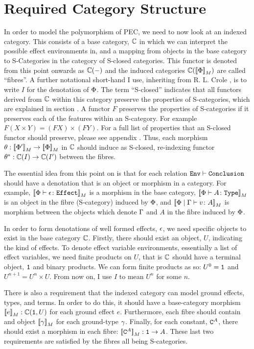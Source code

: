 \documentclass{Report}
\begin{document}
\section{Required Category Structure}
In order to model the polymorphism of PEC, we need to now look at an indexed category. This consists of a base category, $\C$ in which we can interpret the possible effect environments in, and a mapping from objects in the base category to S-Categories in the category of S-closed categories. This functor is denoted from this point onwards as $\C(-)$ and the induced categories $\C(\deno{\P})$ are called ``fibres''. A further notational short-hand I use, inheriting from R. L. Crole , is to write $I$ for the denotation of $\P$. The term ``S-closed'' indicates that all functors derived from $\C$ within this category preserve the properties of S-categories, which are explained in section . A functor $F$ preserves the properties of S-categories if it preserves each of the features within an S-category. For example $F(X\times Y) = (FX)\times (FY)$. For a full list of properties that an S-closed functor should preserve, please see appendix . Thus, each morphism $\theta: \deno{\P'}\rightarrow\deno{\P}$ in $\C$ should induce as S-closed, re-indexing functor $\theta\star: \C(I)\rightarrow\C(I')$ between the fibres.

The essential idea from this point on is that for each relation  $\wellformed{\texttt{Env}}{\texttt{Conclusion}}$ should have a denotation that is an object or morphism in a category. For example, $\deno{\typerelation{\P}{\e}{\effect}}$ is a morphism in the base category, $\deno{\typerelation{\P}{A}{\type}}$ is an object in the fibre (S-category) induced by $\P$, and $\deno{\gpetyperelation{v}{A}}$ is morphism between the objects which denote $\G$ and $A$ in the fibre induced by $\P$.

In order to form denotations of well formed effects, $\e$, we need specific objects to exist in the base category $\C$. Firstly, there should exist an object, $U$, indicating the kind of effects. To denote effect variable environments, essentially a list of effect variables, we need finite products on $U$, that is $\C$ should have a terminal object, $\1$ and binary products. We can form finite products as so: $U^0 = \1$ and $U^{n+1} = U^n\times U$. From now on, I use $I$ to mean $U^n$ for some $n$.

There is also a requirement that the indexed category can model ground effects, types, and terms. In order to do this, it should have a base-category morphism $\deno{e}: \C(\1, U)$ for each ground effect $e$. Furthermore, each fibre should contain and object $\deno{\g}$ for each ground-type $\g$. Finally, for each constant, $\const{A}$, there should exist a morphism in each fibre: $\deno{\const{A}}: \1 \rightarrow A$. These last two requirements are satisfied by the fibres all being S-categories.
\end{document}

